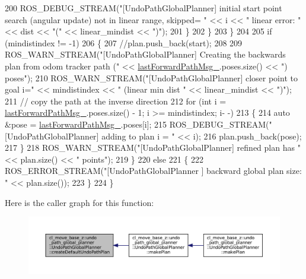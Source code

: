 \begin{DoxyCode}
200                         ROS\_DEBUG\_STREAM(\textcolor{stringliteral}{"[UndoPathGlobalPlanner] initial start point search (angular
       update) not in linear range, skipped= "} << i << \textcolor{stringliteral}{" linear error: "} << dist << \textcolor{stringliteral}{"("} << linear\_mindist << \textcolor{stringliteral}{")"});
201                     \}
202                 \}
203             \}
204 
205             \textcolor{keywordflow}{if} (mindistindex != -1)
206             \{
207                 \textcolor{comment}{//plan.push\_back(start);}
208 
209                 ROS\_WARN\_STREAM(\textcolor{stringliteral}{"[UndoPathGlobalPlanner] Creating the backwards plan from odom tracker path
       ("} << \hyperlink{classcl__move__base__z_1_1undo__path__global__planner_1_1UndoPathGlobalPlanner_a9a4a6e40f5b6cb5f77dedbc5b6170871}{lastForwardPathMsg\_}.poses.size() << \textcolor{stringliteral}{") poses"});
210                 ROS\_WARN\_STREAM(\textcolor{stringliteral}{"[UndoPathGlobalPlanner] closer point to goal i="} << mindistindex << \textcolor{stringliteral}{"
       (linear min dist "} << linear\_mindist << \textcolor{stringliteral}{")"});
211                 \textcolor{comment}{// copy the path at the inverse direction}
212                 \textcolor{keywordflow}{for} (\textcolor{keywordtype}{int} i = \hyperlink{classcl__move__base__z_1_1undo__path__global__planner_1_1UndoPathGlobalPlanner_a9a4a6e40f5b6cb5f77dedbc5b6170871}{lastForwardPathMsg\_}.poses.size() - 1; i >= mindistindex; i-
      -)
213                 \{
214                     \textcolor{keyword}{auto} &pose = \hyperlink{classcl__move__base__z_1_1undo__path__global__planner_1_1UndoPathGlobalPlanner_a9a4a6e40f5b6cb5f77dedbc5b6170871}{lastForwardPathMsg\_}.poses[i];
215                     ROS\_DEBUG\_STREAM(\textcolor{stringliteral}{"[UndoPathGlobalPlanner] adding to plan i = "} << i);
216                     plan.push\_back(pose);
217                 \}
218                 ROS\_WARN\_STREAM(\textcolor{stringliteral}{"[UndoPathGlobalPlanner] refined plan has "} << plan.size() << \textcolor{stringliteral}{"  points"});
219             \}
220             \textcolor{keywordflow}{else}
221             \{
222                 ROS\_ERROR\_STREAM(\textcolor{stringliteral}{"[UndoPathGlobalPlanner ] backward global plan size:  "} << plan.size());
223             \}
224         \}
\end{DoxyCode}
Here is the caller graph for this function\+:
\nopagebreak
\begin{figure}[H]
\begin{center}
\leavevmode
\includegraphics[width=350pt]{classcl__move__base__z_1_1undo__path__global__planner_1_1UndoPathGlobalPlanner_a659c16f439d33ac7026a54bb65c26ca8_icgraph}
\end{center}
\end{figure}
